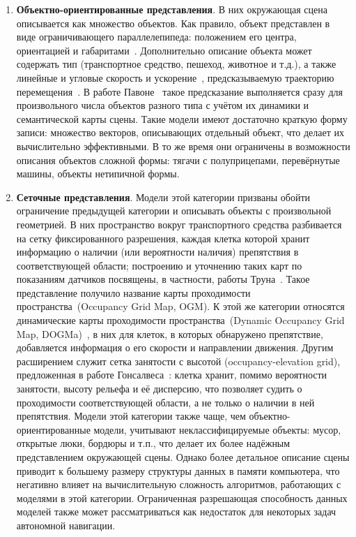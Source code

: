 \begin{enumerate}
	\item \textbf{Объектно-ориентированные представления}. В них окружающая сцена описывается как множество объектов. Как правило, объект представлен в виде ограничивающего параллелепипеда: положением его центра, ориентацией и габаритами~\cite{mao20233d}. Дополнительно описание объекта может содержать тип (транспортное средство, пешеход, животное и т.д.), а также линейные и угловые скорость и ускорение~\cite{caesar2020nuscenes, pieroni2024, wang2024}, предсказываемую траекторию перемещения~\cite{altche2017lstm}. В работе Павоне~\autocite{salzmann2020trajectron} такое предсказание выполняется сразу для произвольного числа объектов разного типа с учётом их динамики и семантической карты сцены. Такие модели имеют достаточно краткую форму записи: множество векторов, описывающих отдельный объект, что делает их вычислительно эффективными. В то же время они ограничены в возможности описания объектов сложной формы: тягачи с полуприцепами, перевёрнутые машины, объекты нетипичной формы.
	
	\item \textbf{Сеточные представления}. Модели этой категории призваны обойти ограничение предыдущей категории и описывать объекты с произвольной геометрией. В них пространство вокруг транспортного средства разбивается на сетку фиксированного разрешения, каждая клетка которой хранит информацию о наличии (или вероятности наличия) препятствия в соответствующей области; построению и уточнению таких карт по показаниям датчиков посвящены, в частности, работы Труна~\cite{thrun2003learning}. Такое представление получило название карты проходимости пространства~(Occupancy Grid Map, OGM). К этой же категории относятся динамические карты проходимости пространства~(Dynamic Occupancy Grid Map, DOGMa)~\cite{nuss2018random}, в них для клеток, в которых обнаружено препятствие, добавляется информация о его скорости и направлении движения. Другим расширением служит сетка занятости с высотой (occupancy-elevation grid), предложенная в работе Гонсалвеса~\autocite{souza2016occupancy}: клетка хранит, помимо вероятности занятости, высоту рельефа и её дисперсию, что позволяет судить о проходимости соответствующей области, а не только о наличии в ней препятствия. Модели этой категории также чаще, чем объектно-ориентированные модели, учитывают неклассифицируемые объекты: мусор, открытые люки, бордюры и т.п., что делает их более надёжным представлением окружающей сцены. Однако более детальное описание сцены приводит к большему размеру структуры данных в памяти компьютера, что негативно влияет на вычислительную сложность алгоритмов, работающих с моделями в этой категории. Ограниченная разрешающая способность данных моделей также может рассматриваться как недостаток для некоторых задач автономной навигации.
	

\end{enumerate}
